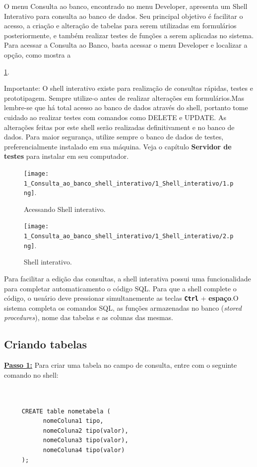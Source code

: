 \documentclass[9pt]{report}
\begin{document}
    O menu Consulta ao banco, encontrado no menu Developer,
    apresenta um Shell Interativo para consulta ao banco de dados.
    Seu principal objetivo é facilitar o acesso, a criação e
    alteração de tabelas para serem utilizadas em formulários
    posteriormente,
    e também realizar testes de funções a serem aplicadas no sistema.
    Para acessar a Consulta ao Banco, basta acessar o menu Developer
    e localizar a opção, como mostra a \figurename{ \ref{fig:acessoShell}.
    
    Importante: O shell interativo existe para realização de
    consultas rápidas, testes e prototipagem. Sempre utilize-o antes
    de realizar alterações em formulários.Mas lembre-se que há total
    acesso ao banco de dados através do shell, portanto tome cuidado
    ao realizar testes com comandos como DELETE e UPDATE. As
    alterações feitas por este shell serão realizadas definitivament
    e no banco de dados. Para maior segurança, utilize sempre o
    banco de dados de testes, preferencialmente instalado em sua
    máquina.
    Veja o capítulo \textbf{Servidor de testes} para instalar em
    seu computador.
   
   
     \begin{figure}[H]
       \texttt{[image: 1\_Consulta\_ao\_banco\_shell\_interativo/1\_Shell\_interativo/1.png]}.
       \caption{Acessando Shell interativo.}
       \label{fig:acessoShell}
     \end{figure}

     \begin{figure}[H]
       \texttt{[image: 1\_Consulta\_ao\_banco\_shell\_interativo/1\_Shell\_interativo/2.png]}.       
       \caption{Shell interativo.}
       \label{fig:shell}
     \end{figure}

     Para facilitar a edição das consultas, a shell interativa possui
     uma funcionalidade para completar automaticamento o código SQL.
     Para que a shell complete o código, o usuário deve pressionar
     simultanemente as teclas \texttt{\textbf{Ctrl}} + {\textbf{espaço}}.O sistema completa os comandos SQL, as funções
     armazenadas no banco (\textit{stored procedures}), nome das
     tabelas e as colunas das mesmas.
     
   \subsection{Criando tabelas}

   \underline{\textbf{Passo 1:}}  Para criar uma tabela no campo de
   consulta, entre com o seguinte comando no shell:
   \\
   \\
   \\
   \begin{lstlisting}
     CREATE table nometabela (
           nomeColuna1 tipo,
           nomeColuna2 tipo(valor),
           nomeColuna3 tipo(valor),
           nomeColuna4 tipo(valor)
     );
   \end{lstlisting}

}
\end{document}
